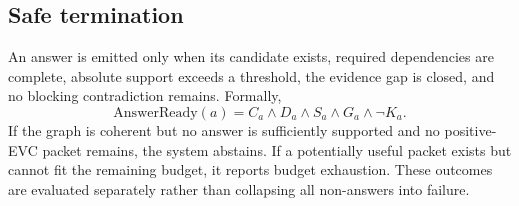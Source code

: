 \subsection{Safe termination}
An answer is emitted only when its candidate exists, required dependencies are complete, absolute support exceeds a threshold, the evidence gap is closed, and no blocking contradiction remains. Formally,
\begin{equation}
\mathrm{AnswerReady}(a)=C_a\land D_a\land S_a\land G_a\land\neg K_a.
\end{equation}
If the graph is coherent but no answer is sufficiently supported and no positive-EVC packet remains, the system abstains. If a potentially useful packet exists but cannot fit the remaining budget, it reports budget exhaustion. These outcomes are evaluated separately rather than collapsing all non-answers into failure.

